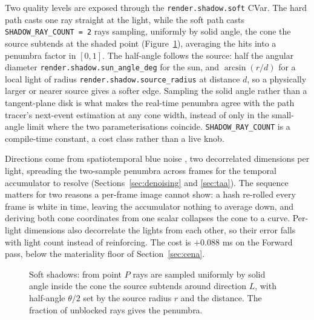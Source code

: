 Two quality levels are exposed through the \texttt{render.shadow.soft} CVar. The hard path casts one
ray straight at the light, while the soft path casts \texttt{SHADOW_RAY_COUNT = 2} rays sampling,
uniformly by solid angle, the cone the source subtends at the shaded point (Figure~\ref{fig:shadow}),
averaging the hits into a penumbra factor in $[0,1]$. The half-angle follows the source: half the
angular diameter \texttt{render.shadow.sun\_angle\_deg} for the sun, and $\arcsin(r/d)$ for a local
light of radius \texttt{render.shadow.source\_radius} at distance $d$, so a physically larger or
nearer source gives a softer edge. Sampling the solid angle rather than a tangent-plane disk is what makes the real-time
penumbra agree with the path tracer's next-event estimation at any cone width, instead of only in the
small-angle limit where the two parameterisations coincide. \texttt{SHADOW_RAY_COUNT} is a
compile-time constant, a cost class rather than a live knob.

Directions come from spatiotemporal blue noise \cite{wolfe2022stbn}, two decorrelated dimensions per
light, spreading the two-sample penumbra across frames for the temporal accumulator to resolve
(Sections~\ref{sec:denoising} and \ref{sec:taa}). The sequence matters for two reasons a per-frame
image cannot show: a hash re-rolled every frame is white in time, leaving the accumulator nothing to
average down, and deriving both cone coordinates from one scalar collapses the cone to a curve. Per-light
dimensions also decorrelate the lights from each other, so their error falls with light count instead
of reinforcing. The cost is \(+0.088\) ms on the Forward pass, below the materiality floor of
Section~\ref{sec:cena}.

\begin{figure}[tbp]
\centering
{}
\caption[Soft shadow cone sampling]{Soft shadows: from point $P$ rays are sampled uniformly by solid angle inside the cone the
source subtends around direction $L$, with half-angle $\theta/2$ set by the source radius $r$ and the
distance. The fraction of unblocked rays gives the penumbra.}
\label{fig:shadow}
\end{figure}

